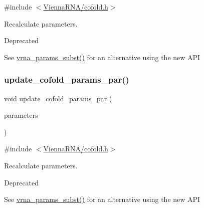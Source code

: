 {\ttfamily \#include $<$\mbox{\hyperlink{cofold_8h}{Vienna\+R\+N\+A/cofold.\+h}}$>$}



Recalculate parameters. 

\begin{DoxyRefDesc}{Deprecated}
\item[\mbox{\hyperlink{deprecated__deprecated000033}{Deprecated}}]See \mbox{\hyperlink{group__energy__parameters_ga5d1909208f7ea3baa98b75afaa1f62ca}{vrna\+\_\+params\+\_\+subst()}} for an alternative using the new A\+PI \end{DoxyRefDesc}
\mbox{\label{group__mfe__cofold_gaaadbd28b4e428710529ab4098fdacad3}} 
\subsubsection{\texorpdfstring{update\+\_\+cofold\+\_\+params\+\_\+par()}{update\_cofold\_params\_par()}}
{\footnotesize\ttfamily void update\+\_\+cofold\+\_\+params\+\_\+par (\begin{DoxyParamCaption}\item[{\mbox{\hyperlink{group__energy__parameters_ga8a69ca7d787e4fd6079914f5343a1f35}{vrna\+\_\+param\+\_\+t}} $\ast$}]{parameters }\end{DoxyParamCaption})}



{\ttfamily \#include $<$\mbox{\hyperlink{cofold_8h}{Vienna\+R\+N\+A/cofold.\+h}}$>$}



Recalculate parameters. 

\begin{DoxyRefDesc}{Deprecated}
\item[\mbox{\hyperlink{deprecated__deprecated000034}{Deprecated}}]See \mbox{\hyperlink{group__energy__parameters_ga5d1909208f7ea3baa98b75afaa1f62ca}{vrna\+\_\+params\+\_\+subst()}} for an alternative using the new A\+PI \end{DoxyRefDesc}
\mbox{\label{group__mfe__cofold_ga5f5bf4df35d0554f6ace9579f8744c48}} 

